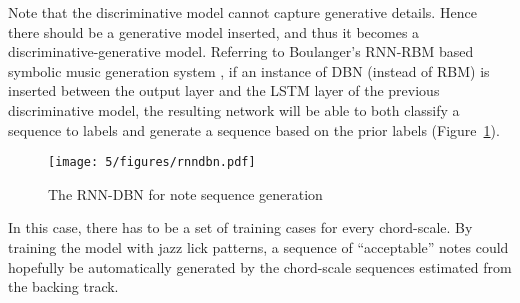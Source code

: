 Note that the discriminative model cannot capture generative details. Hence there should be a generative model inserted, and thus it becomes a discriminative-generative model. Referring to Boulanger's RNN-RBM based symbolic music generation system \cite{boulanger2012modeling}, if an instance of DBN (instead of RBM) is inserted between the output layer and the LSTM layer of the previous discriminative model, the resulting network will be able to both classify a sequence to labels and generate a sequence based on the prior labels (Figure~\ref{fig:5-rnndbn}).

\begin{figure}[htb]
    \centering
        \texttt{[image: 5/figures/rnndbn.pdf]}
    \caption{The RNN-DBN for note sequence generation}
    \label{fig:5-rnndbn}
\end{figure}

In this case, there has to be a set of training cases for every chord-scale. By training the model with jazz lick patterns, a sequence of ``acceptable'' notes could hopefully be automatically generated by the chord-scale sequences estimated from the backing track.





 







